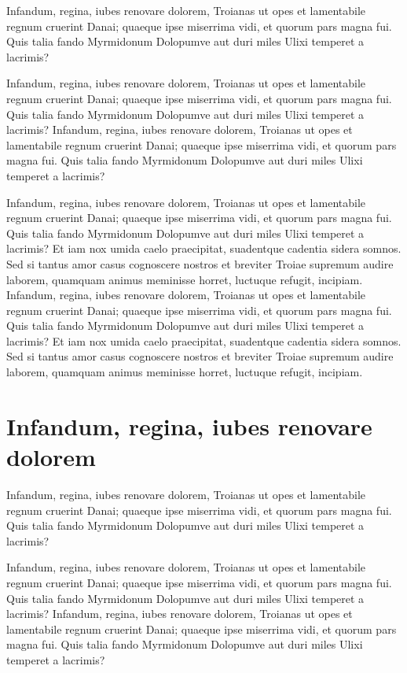 \documentclass[
   \selectedoptions
  ]
  {aipproc}
\begin{document}
Infandum, regina, iubes renovare dolorem, Troianas ut opes et
lamentabile regnum cruerint Danai; quaeque ipse miserrima vidi, et
quorum pars magna fui. Quis talia fando Myrmidonum Dolopumve aut duri
miles Ulixi temperet a lacrimis? 



Infandum, regina, iubes renovare dolorem, Troianas ut opes et
lamentabile regnum cruerint Danai; quaeque ipse miserrima vidi, et
quorum pars magna fui. Quis talia fando Myrmidonum Dolopumve aut duri
miles Ulixi temperet a lacrimis? 
Infandum, regina, iubes renovare dolorem, Troianas ut opes et
lamentabile regnum cruerint Danai; quaeque ipse miserrima vidi, et
quorum pars magna fui. Quis talia fando Myrmidonum Dolopumve aut duri
miles Ulixi temperet a lacrimis? 

Infandum, regina, iubes renovare dolorem, Troianas ut opes et
lamentabile regnum cruerint Danai; quaeque ipse miserrima vidi, et
quorum pars magna fui. Quis talia fando Myrmidonum Dolopumve aut duri
miles Ulixi temperet a lacrimis? Et iam nox umida caelo praecipitat,
suadentque cadentia sidera somnos. Sed si tantus amor casus  \cite{Liang:1983}
cognoscere nostros et breviter Troiae supremum audire laborem,
quamquam animus meminisse horret, luctuque refugit, incipiam.
Infandum, regina, iubes renovare dolorem, Troianas ut opes et
lamentabile regnum cruerint Danai; quaeque ipse miserrima vidi, et
quorum pars magna fui. Quis talia fando Myrmidonum Dolopumve aut duri
miles Ulixi temperet a  \cite{SJ:1999} lacrimis? Et iam nox umida caelo praecipitat,
suadentque cadentia sidera somnos. Sed si tantus amor casus
cognoscere nostros et breviter Troiae supremum audire laborem,
quamquam animus meminisse horret, luctuque refugit, incipiam.

\section{Infandum, regina, iubes renovare dolorem}

Infandum, regina, iubes renovare dolorem, Troianas ut opes et
lamentabile regnum cruerint Danai; quaeque ipse miserrima vidi, et
quorum pars magna fui. Quis talia fando Myrmidonum Dolopumve aut duri
miles Ulixi temperet a lacrimis? 

Infandum, regina, iubes renovare dolorem, Troianas ut opes et
lamentabile regnum cruerint Danai; quaeque ipse miserrima vidi, et
quorum pars magna fui. Quis talia fando Myrmidonum Dolopumve aut duri
miles Ulixi temperet a lacrimis? 
Infandum, regina, iubes renovare dolorem, Troianas ut opes et
lamentabile regnum cruerint Danai; quaeque ipse miserrima vidi, et
quorum pars magna fui. Quis talia fando Myrmidonum Dolopumve aut duri
miles Ulixi temperet a lacrimis? 
\end{document}

